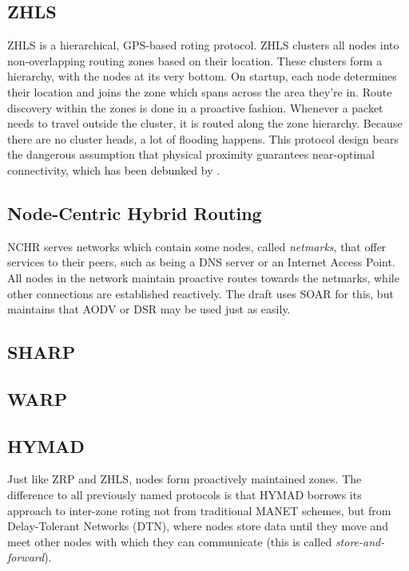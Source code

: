 \documentclass[a4paper,10pt]{scrartcl}
\begin{document}
\subsection{\gls{ZHLS}}
\label{subsec:zhls}
ZHLS is a hierarchical, GPS-based roting protocol.
ZHLS clusters all nodes into non-overlapping routing zones based on their location. These clusters form a hierarchy, with the nodes at its very bottom.
On startup, each node determines their location and joins the zone which spans across the area they're in. Route discovery within the zones is done in a proactive fashion. Whenever a packet needs to travel outside the cluster, it is routed along the zone hierarchy. Because there are no cluster heads, a lot of flooding happens. 
This protocol design bears the dangerous assumption that physical proximity guarantees near-optimal connectivity, which has been debunked by \cite{mistaken-axioms}. 

\subsection{Node-Centric Hybrid Routing}
\label{subsec:nchr}
NCHR serves networks which contain some nodes, called \emph{netmarks}, that offer services to their peers, such as being a DNS server or an Internet Access Point. All nodes in the network maintain proactive routes towards the netmarks, while other connections are established reactively. The draft uses SOAR\cite{SOAR} for this, but maintains that AODV\cite{RFC-3561} or DSR\cite{DSR} may be used just as easily.

\subsection{\gls{SHARP}}
\label{subsec:sharp}

\subsection{\gls{WARP}}
\label{subsec:warp}

\subsection{\gls{HYMAD}}
\label{subsec:hymad}
Just like ZRP and ZHLS, nodes form proactively maintained zones. The difference to all previously named protocols is that HYMAD borrows its approach to inter-zone roting not from traditional \gls{MANET} schemes, but from Delay-Tolerant Networks (DTN), where nodes store data until they move and meet other nodes with which they can communicate (this is called \emph{store-and-forward}).
\end{document}
